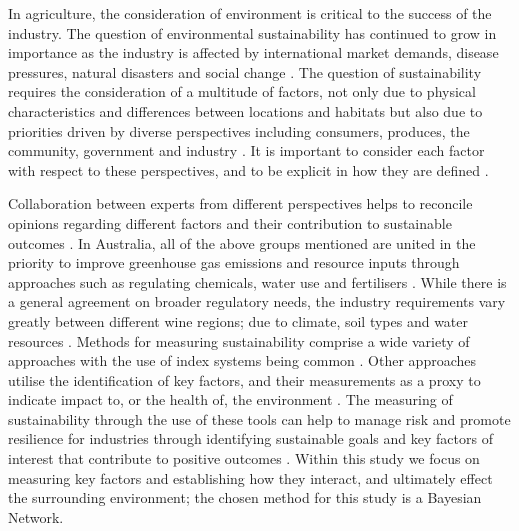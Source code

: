 In agriculture, the consideration of environment is critical to the success of the industry. The question of environmental sustainability has continued to grow in importance as the industry is affected by international market demands, disease pressures, natural disasters and social change \citep{wineaustraliaNationalVintageReport2022,wineaustraliaNationalVintageReport2020,wineaustraliaNationalVintageReport2021,cassonMultidisciplinaryApproachAssess2022}. The question of sustainability requires the consideration of a multitude of factors, not only due to physical characteristics and differences between locations and habitats but also due to priorities driven by diverse perspectives including consumers, produces, the community, government and industry \citep{baianoOverviewSustainabilityWine2021,wayeCarbonFootprintsFood2008}. It is important to consider each factor with respect to these perspectives, and to be explicit in how they are defined \citep{santiago-brownSustainabilityAssessmentWineGrape2015}.

Collaboration between experts from different perspectives helps to reconcile opinions regarding different factors and their contribution to sustainable outcomes \citep{dichiaraCollaborativeApproachAchieving2024}. In Australia, all of the above groups mentioned are  united in the priority to improve greenhouse gas emissions and resource inputs through approaches such as regulating chemicals, water use and fertilisers \citep{dumbrellComparingAustralianPublic2024}. While there is a general agreement on broader regulatory needs, the industry requirements vary greatly between different wine regions; due to climate, soil types and water resources \citep{abbalDecisionSupportSystem2016,agostaRegionalClimateVariability2012}.
% 
Methods for measuring sustainability comprise a wide variety of approaches with the use of index systems being common \citep{gehringerMappingSustainabilityMeasurement2024}. Other approaches utilise the identification of key factors, and their measurements as a proxy to indicate impact to, or the health of, the environment \citep{floresWhatSustainabilityWine2018}. The measuring of sustainability through the use of these tools can help to manage risk and promote resilience for industries through identifying sustainable goals and key factors of interest that contribute to positive outcomes \citep{klemesAssessingMeasuringEnvironmental2015, beckerSustainabilityScienceManaging2024}. Within this study we focus on measuring key factors and establishing how they interact, and ultimately effect the surrounding environment; the chosen method for this study is a Bayesian Network.
